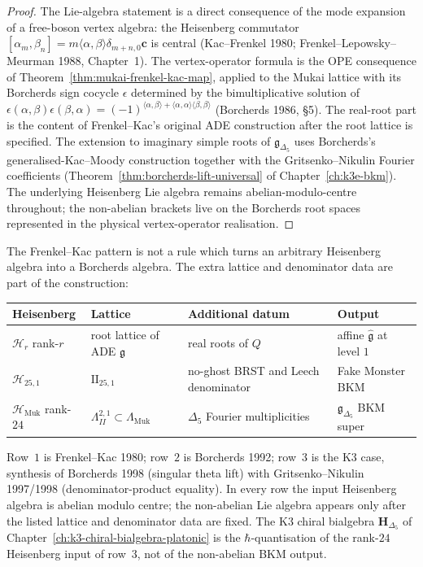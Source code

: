 \begin{proof}
The Lie-algebra statement is a direct consequence of the mode expansion of a
free-boson vertex algebra: the Heisenberg commutator $[\alpha_m,\beta_n] =
m\langle\alpha,\beta\rangle\delta_{m+n,0}\mathbf{c}$ is central
(Kac--Frenkel 1980; Frenkel--Lepowsky--Meurman 1988, Chapter~1). The
vertex-operator formula is the OPE consequence of
Theorem~\ref{thm:mukai-frenkel-kac-map}, applied to the Mukai lattice with its
Borcherds sign cocycle $\epsilon$ determined by the bimultiplicative solution of
$\epsilon(\alpha,\beta)\epsilon(\beta,\alpha)
= (-1)^{\langle\alpha,\beta\rangle+\langle\alpha,\alpha\rangle\langle\beta,\beta\rangle}$
(Borcherds 1986, §5). The real-root part is the content of Frenkel--Kac's
original ADE construction after the root lattice is specified. The extension
to imaginary simple roots of $\mathfrak{g}_{\Delta_5}$ uses Borcherds's
generalised-Kac--Moody construction together with the Gritsenko--Nikulin
Fourier coefficients
(Theorem~\ref{thm:borcherds-lift-universal} of Chapter~\ref{ch:k3e-bkm}).
The underlying Heisenberg Lie algebra remains abelian-modulo-centre
throughout; the non-abelian brackets live on the Borcherds root spaces
represented in the physical vertex-operator realisation.
\end{proof}

\begin{remark}
\label{rem:k3-yangian-frenkel-kac-dictionary}
The Frenkel--Kac pattern is not a rule which turns an arbitrary
Heisenberg algebra into a Borcherds algebra. The extra lattice and
denominator data are part of the construction:
\begin{center}
\renewcommand{\arraystretch}{1.3}
\begin{tabular}{@{}llll@{}}
\textbf{Heisenberg} & \textbf{Lattice} & \textbf{Additional datum} & \textbf{Output} \\ \hline
$\mathcal{H}_r$ rank-$r$ & root lattice of ADE $\mathfrak{g}$ & real roots of $Q$ & affine $\widehat{\mathfrak{g}}$ at level $1$ \\
$\mathcal{H}_{25,1}$ & $\mathrm{II}_{25,1}$ & no-ghost BRST and Leech denominator & Fake Monster BKM \\
$\mathcal{H}_{\mathrm{Muk}}$ rank-$24$ & $\Lambda^{2,1}_{II}\subset\Lambda_{\mathrm{Muk}}$ & $\Delta_5$ Fourier multiplicities & $\mathfrak{g}_{\Delta_5}$ BKM super
\end{tabular}
\end{center}
Row~$1$ is Frenkel--Kac 1980; row~$2$ is Borcherds 1992; row~$3$ is the K3 case, synthesis
of Borcherds 1998 (singular theta lift) with Gritsenko--Nikulin 1997/1998
(denominator-product equality). In every row the input Heisenberg algebra is
abelian modulo centre; the non-abelian Lie algebra appears only after the
listed lattice and denominator data are fixed. The K3 chiral bialgebra
$\mathbf{H}_{\Delta_5}$ of Chapter~\ref{ch:k3-chiral-bialgebra-platonic} is the
$\hbar$-quantisation of the rank-$24$ Heisenberg input of row~$3$, not of the
non-abelian BKM output.
\end{remark}


